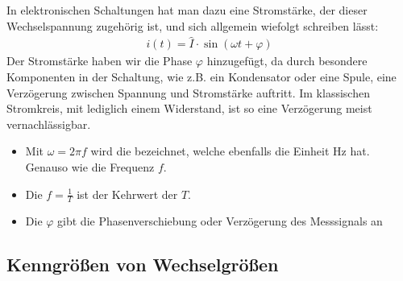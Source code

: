 \documentclass[letterpaper,10pt,english]{jupyterBook}
\begin{document}
\sphinxAtStartPar
In elektronischen Schaltungen hat man dazu eine Stromstärke, der dieser Wechselspannung zugehörig ist, und sich allgemein wiefolgt schreiben lässt:
\begin{equation*}
\begin{split}i(t) = \hat I \cdot \sin(\omega t + \varphi)\end{split}
\end{equation*}
\sphinxAtStartPar
Der Stromstärke haben wir die Phase \(\varphi\) hinzugefügt, da durch besondere Komponenten in der Schaltung, wie z.B. ein Kondensator oder eine Spule, eine Verzögerung zwischen Spannung und Stromstärke auftritt. Im klassischen Stromkreis, mit lediglich einem Widerstand, ist so eine Verzögerung meist vernachlässigbar.
\begin{itemize}
\item {} 
\sphinxAtStartPar
Mit \(\omega = 2\pi f\) wird die  bezeichnet, welche ebenfalls die Einheit Hz hat. Genauso wie die Frequenz \(f\).

\item {} 
\sphinxAtStartPar
Die  \(f = \frac{1}{T}\) ist der Kehrwert der  \(T\).

\item {} 
\sphinxAtStartPar
Die  \(\varphi\) gibt die Phasenverschiebung oder Verzögerung des Messsignals an

\end{itemize}


\subsection{Kenngrößen von Wechselgrößen}
\label{\detokenize{content/3_Kenngroessen:kenngroszen-von-wechselgroszen}}
\sphinxAtStartPar
\end{document}

